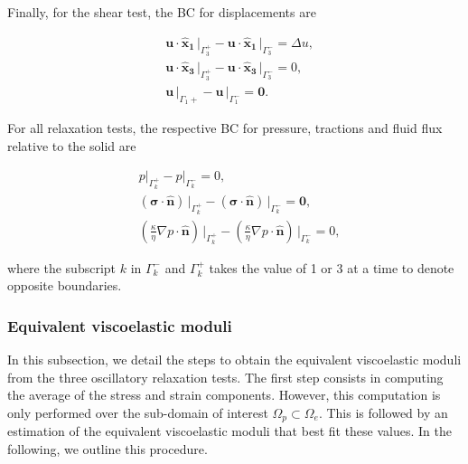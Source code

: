 \documentclass[draft]{agujournal2019}
\begin{document}
Finally, for the shear test, the BC for displacements are
\begin{linenomath*}
\begin{equation}\label{Eq.10}
\begin{split}
& \bm{u} \cdot \bm{\hat{x}_1}\,\vert_{\Gamma_3^+}- \bm{u} \cdot \bm{\hat{x}_1} \,\vert_{\Gamma_3^-} =\Delta u,\\
& \bm{u} \cdot \bm{\hat{x}_3}\,\vert_{\Gamma_3^+}- \bm{u} \cdot \bm{\hat{x}_3}\,\vert_{\Gamma_3^-} = 0, \\
& \bm{u}\,\vert_{\Gamma_1+}- \bm{u}\,\vert_{\Gamma_1^-} =\bm{0}.
\end{split}
\end{equation}
\end{linenomath*}

For all relaxation tests, the respective BC for pressure, tractions and fluid flux relative to the solid are
\begin{linenomath*}
\begin{equation}\label{Eq.11}
\begin{split}
& p\vert_{\Gamma_k^+}-p\vert_{\Gamma_k^-} =0, \\
& \left(\bm{\sigma}\cdot \bm{\hat n} \right)\, \vert_{\Gamma_k^+}-\left(\bm{\sigma}\cdot \bm{\hat n} \right)\, \vert_{\Gamma_k^-} = \bm{0},\\
&\left( \frac{\kappa}{\eta} \nabla p \cdot \bm{\hat n} \right) \, \vert_{\Gamma_k^+} -\left( \frac{\kappa}{\eta} \nabla p \cdot \bm{\hat n} \right) \, \vert_{\Gamma_k^-} = 0,
\end{split}
\end{equation}
\end{linenomath*}
where the subscript $k$ in $\Gamma_k^-$ and $\Gamma_k^+$ takes the value of 1 or 3 at a time to denote opposite boundaries.

\subsubsection{Equivalent viscoelastic moduli}
In this subsection, we detail the steps to obtain the equivalent viscoelastic moduli from the three oscillatory relaxation tests. The first step consists in computing the average of the  stress and strain components. However, this computation is only performed over the sub-domain of interest $\Omega_p \subset \Omega_e$. This is followed by an estimation of the equivalent viscoelastic moduli that best fit these values. In the following, we outline this procedure.
\end{document}
